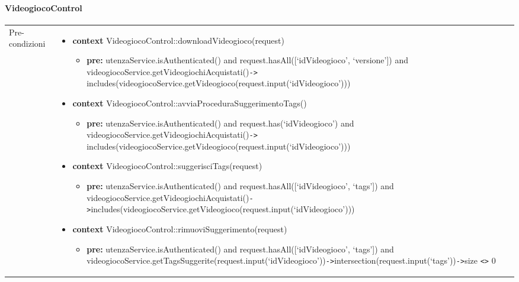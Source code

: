 \newpage
\paragraph{VideogiocoControl}
\small\begin{tabular}{|| l | p{28.5em} ||} 
\hline
Pre-condizioni & \begin{itemize}[leftmargin=*]
	\item \textbf{context} VideogiocoControl::downloadVideogioco(request)
	\begin{itemize}
		\item[ ] \textbf{pre:} utenzaService.isAuthenticated()
		and request.hasAll([‘idVideogioco’, ‘versione’])
		and videogiocoService.getVideogiochiAcquistati()\verb|->| includes(videogiocoService\newline .getVideogioco(request.input(‘idVideogioco’)))	
	\end{itemize}

	\item \textbf{context} VideogiocoControl::avviaProceduraSuggerimentoTags()
	\begin{itemize}
		\item[ ] \textbf{pre:} utenzaService.isAuthenticated()
		and request.has(‘idVideogioco’)
		and videogiocoService.getVideogiochiAcquistati()\verb|->| includes(videogiocoService\newline .getVideogioco(request.input(‘idVideogioco’)))
	\end{itemize}

	\item \textbf{context} VideogiocoControl::suggerisciTags(request)
	\begin{itemize}
		\item[ ] \textbf{pre:} utenzaService.isAuthenticated() and request.hasAll([‘idVideogioco’, ‘tags’])
		and videogiocoService.getVideogiochiAcquistati()\verb|->|includes(videogiocoService\newline .getVideogioco(request.input(‘idVideogioco’)))
	\end{itemize}

	\item \textbf{context} VideogiocoControl::rimuoviSuggerimento(request)
	\begin{itemize}
		\item[ ] \textbf{pre:} utenzaService.isAuthenticated()
		and request.hasAll([‘idVideogioco’, ‘tags’])
		and videogiocoService.getTagsSuggerite(request.input(‘idVideogioco’))\verb|->|intersection(request.input(‘tags’))\verb|->|size \verb|<>| 0	
	\end{itemize}


\end{itemize}
\end{tabular}
